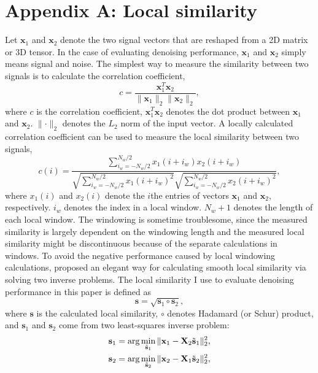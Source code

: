 \section{Appendix A: Local similarity}
Let $\mathbf{x}_1$ and $\mathbf{x}_2$ denote the two signal vectors that are reshaped from a 2D matrix or 3D tensor. In the case of evaluating denoising performance, $\mathbf{x}_1$ and $\mathbf{x}_2$ simply means signal and noise.
The simplest way to measure the similarity between two signals is to calculate the correlation coefficient,
\begin{equation}
\label{eq:corr}
c=\frac{\mathbf{x}_1^T\mathbf{x}_2}{\parallel \mathbf{x}_1 \parallel_2 \parallel \mathbf{x}_2 \parallel_2},
\end{equation}
where $c$ is the correlation coefficient, $\mathbf{x}_1^T\mathbf{x}_2$ denotes the dot product between $\mathbf{x}_1$ and $\mathbf{x}_2$. $\parallel \cdot \parallel_2$ denotes the $L_2$ norm of the input vector. A locally calculated correlation coefficient can be used to measure the local similarity between two signals,
\begin{equation}
\label{eq:localcorr}
c(i) =  \frac{\sum_{i_w=-N_w/2}^{N_w/2} x_1(i+i_w)x_2(i+i_w)}{\sqrt{\sum_{i_w=-N_w/2}^{N_w/2} x_1(i+i_w)^2}\sqrt{\sum_{i_w=-N_w/2}^{N_w/2} x_2(i+i_w)^2}},
\end{equation}
where $x_1(i)$ and $x_2(i)$ denote the $i$the entries of vectors $\mathbf{x}_1$ and $\mathbf{x}_2$, respectively. $i_w$ denotes the index in a local window. $N_w+1$ denotes the length of each local window. The windowing is sometime troublesome, since the measured similarity is largely dependent on the windowing length and the measured local similarity might be discontinuous because of the separate calculations in windows. To avoid the negative performance caused by local windowing calculations, \cite{fomel2007localattr} proposed an elegant way for calculating smooth local similarity via solving two inverse problems. 
The local similarity I use to evaluate denoising performance in this paper is defined as 
\begin{equation}
\label{eq:cc}
\mathbf{s}=\sqrt{\mathbf{s}_1\circ\mathbf{s}_2},
\end{equation}
where $\mathbf{s}$ is the calculated local similarity, $\circ$ denotes Hadamard (or Schur) product, and $\mathbf{s}_1$ and $\mathbf{s}_2$ come from two least-squares inverse problem:
\begin{align}
\label{eq:local1}
\mathbf{s}_1 &=\arg\min_{\tilde{\mathbf{s}}_1}\Arrowvert \mathbf{x}_1-\mathbf{X}_2\tilde{\mathbf{s}}_1 \Arrowvert_2^2, \\
\label{eq:local2}
\mathbf{s}_2 &=\arg\min_{\tilde{\mathbf{s}}_2}\Arrowvert \mathbf{x}_2-\mathbf{X}_1\tilde{\mathbf{s}}_2 \Arrowvert_2^2,
\end{align}
